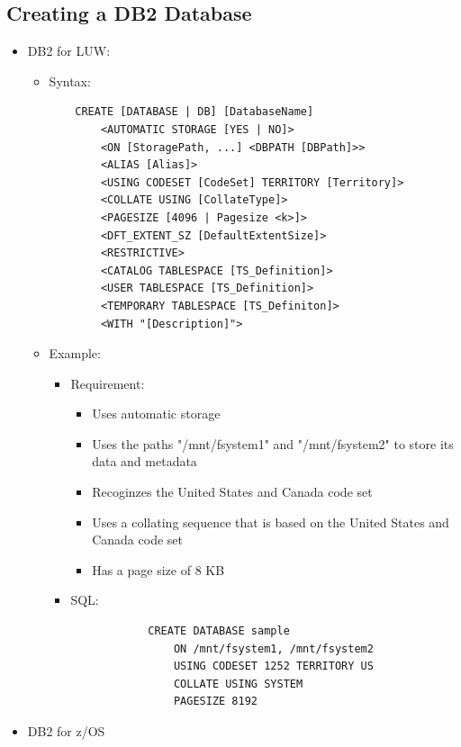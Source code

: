 \documentclass{article}
\begin{document}
\subsection{Creating a DB2 Database}
\begin{itemize}
\item DB2 for LUW:
	\begin{itemize}
	\item Syntax:
	\begin{verbatim}
	CREATE [DATABASE | DB] [DatabaseName]
		<AUTOMATIC STORAGE [YES | NO]>
		<ON [StoragePath, ...] <DBPATH [DBPath]>>
		<ALIAS [Alias]>
		<USING CODESET [CodeSet] TERRITORY [Territory]>
		<COLLATE USING [CollateType]>
		<PAGESIZE [4096 | Pagesize <k>]>
		<DFT_EXTENT_SZ [DefaultExtentSize]>
		<RESTRICTIVE>
		<CATALOG TABLESPACE [TS_Definition]>
		<USER TABLESPACE [TS_Definition]>
		<TEMPORARY TABLESPACE [TS_Definiton]>
		<WITH "[Description]">		
	\end{verbatim}
	\item Example:
		\begin{itemize}
		\item Requirement:
			\begin{itemize}
			\item Uses automatic storage
			\item Uses the paths "/mnt/fsystem1" and "/mnt/fsystem2" to store its data and metadata
			\item Recoginzes the United States and Canada code set
			\item Uses a collating sequence that is based on the United States and Canada code set
			\item Has a page size of 8 KB
			\end{itemize}
		\item SQL:
			\begin{verbatim}
			CREATE DATABASE sample
				ON /mnt/fsystem1, /mnt/fsystem2
				USING CODESET 1252 TERRITORY US
				COLLATE USING SYSTEM
				PAGESIZE 8192
			\end{verbatim}
		\end{itemize}
	\end{itemize}
\item DB2 for z/OS
\end{itemize}
\end{document}
